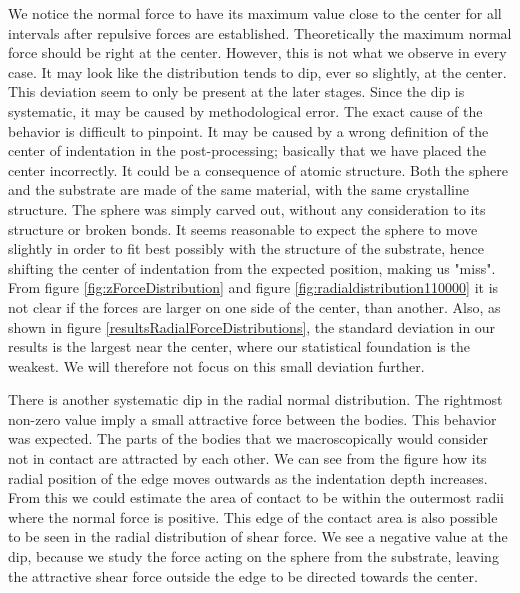 \documentclass[twoside,english]{uiofysmaster}
\begin{document}
 We notice the normal force to have its maximum value close to the center for all intervals after repulsive forces are established. 
 Theoretically the maximum normal force should be right at the center. 
 However, this is not what we observe in every case. 
 It may look like the distribution tends to dip, ever so slightly, at the center.  
 This deviation seem to only be present at the later stages. 
 Since the dip is systematic, it may be caused by methodological error.  
 The exact cause of the behavior is difficult to pinpoint. 
 It may be caused by a wrong definition of the center of indentation in the post-processing; basically that we have placed the center incorrectly. 
 It could be a 	consequence of atomic structure. 
 Both the sphere and the substrate are made of the same material, with the same crystalline structure. 
 The sphere was simply carved out, without any consideration to its structure or broken bonds. 
 It seems reasonable to expect the sphere to move slightly in order to fit best possibly with the structure of the substrate, hence shifting the center of indentation from the expected position, making us "miss". \\
 From figure \ref{fig:zForceDistribution} and figure \ref{fig:radialdistribution110000} it is not clear if the forces are larger on one side of the center, than another. 
 Also, as shown in figure \ref{resultsRadialForceDistributions}, the standard deviation in our results is the largest near the center, where our statistical foundation is the weakest. 
 We will therefore not focus on this small deviation further.
 
 
 

 
 There is another systematic dip in the radial normal distribution. 
 The rightmost non-zero value imply a small attractive force between the bodies. 
 This behavior was expected. 
 The parts of the  bodies that we macroscopically would consider not in contact are attracted by each other. 
 We can see from the figure how its radial position of the edge moves outwards as the indentation depth increases.
 From this we could estimate the area of contact to be within the  outermost radii where the normal force is positive.  
 This edge of the contact area is also possible to be seen in the radial distribution of shear force. 
 We see a negative value at the dip, because we study the force acting on the sphere from the substrate, leaving the attractive shear force outside the edge to be directed towards the center. 
  
\end{document}
